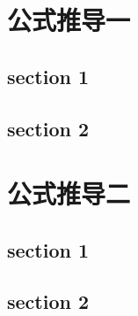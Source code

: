 \chapter{公式推导一}
\section{section 1}
\section{section 2}

\chapter{公式推导二}
\section{section 1}
\section{section 2}
